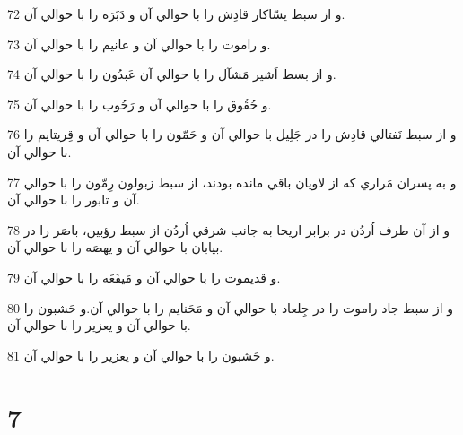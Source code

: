 \par 72 و از سبط يسّاکار قادِش را با حوالي آن و دَبَرَه را با حوالي آن.
\par 73 و راموت را با حوالي آن و عانيم را با حوالي آن.
\par 74 و از بسط اَشير مَشآل را با حوالي آن عَبدُون را با حوالي آن.
\par 75 و حُقُوق را با حوالي آن و رَحُوب را با حوالي آن.
\par 76 و از سبط نَفتالي قادِش را در جَلِيل با حوالي آن و حَمّون را با حوالي آن و قِريتايم را با حوالي آن.
\par 77 و به پسران مَراري که از لاويان باقي مانده بودند، از سبط زبولون رِمّون را با حوالي آن و تابور را با حوالي آن.
\par 78 و از آن طرف اُردُن در برابر اريحا به جانب شرقي اُردُن از سبط رؤبين، باصَر را در بيابان با حوالي آن و يهصَه را با حوالي آن.
\par 79 و قديموت را با حوالي آن و مَيفَعَه را با حوالي آن.
\par 80 و از سبط جاد راموت را در جِلعاد با حوالي آن و مَحَنايم را با حوالي آن.و حَشبون را با حوالي آن و يعزير را با حوالي آن.
\par 81 و حَشبون را با حوالي آن و يعزير را با حوالي آن.
 
\chapter{7}

